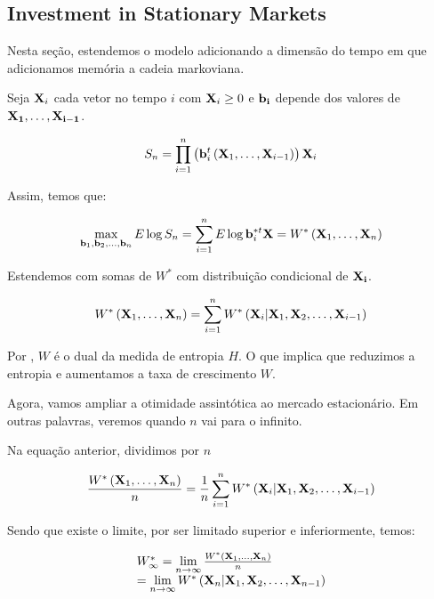 \subsection{Investment in Stationary Markets}

Nesta seção, estendemos o modelo adicionando a dimensão do tempo em que adicionamos memória a cadeia markoviana.

Seja ${{\bf{X}}_i}$ cada vetor no tempo $i$ com ${{\bf{X}}_i} \ge 0$ e $\bf{b}_i$ depende dos valores de $\bf{X}_1, \dots, \bf{X}_{i-1}$.

\[{S_n} = \prod\limits_{i = 1}^n {\left( {{\bf{b}}_i^t\left( {{{\bf{X}}_1}, \ldots ,{{\bf{X}}_{i - 1}}} \right)} \right){{\bf{X}}_i}} \]

Assim, temos que:

\[\mathop {\max }\limits_{{{\bf{b}}_1},{{\bf{b}}_2}, \ldots ,{{\bf{b}}_n}} E\log {S_n} = \sum\limits_{i = 1}^n {E\log {\bf{b}}_i^{*t}{\bf{X}}}  = {W^*}\left( {{{\bf{X}}_1}, \ldots ,{{\bf{X}}_n}} \right)\]

Estendemos com somas de $W^*$ com distribuição condicional de $\bf{X}_i$.

\[{W^*}\left( {{{\bf{X}}_1}, \ldots ,{{\bf{X}}_n}} \right) = \sum\limits_{i = 1}^n {{W^*}\left( {{{\bf{X}}_i}|{{\bf{X}}_1},{{\bf{X}}_2}, \ldots ,{{\bf{X}}_{i - 1}}} \right)} \]

Por \cite{Cover:2006:EIT:1146355}, $W$ é o dual da medida de entropia $H$. O que implica que reduzimos a entropia e aumentamos a taxa de crescimento $W$.

Agora, vamos ampliar a otimidade assintótica ao mercado estacionário. Em outras palavras, veremos quando $ n $ vai para o infinito.

Na equação anterior, dividimos por $n$

\[\frac{{{W^*}\left( {{{\bf{X}}_1}, \ldots ,{{\bf{X}}_n}} \right)}}{n} = \frac{1}{n}\sum\limits_{i = 1}^n {{W^*}\left( {{{\bf{X}}_i}|{{\bf{X}}_1},{{\bf{X}}_2}, \ldots ,{{\bf{X}}_{i - 1}}} \right)} \]

Sendo que existe o limite, por ser limitado superior e inferiormente, temos:

\[\begin{array}{l}
W_\infty ^* = \mathop {\lim }\limits_{n \to \infty } \frac{{{W^*}\left( {{{\bf{X}}_1}, \ldots ,{{\bf{X}}_n}} \right)}}{n}\\
 = \mathop {\lim }\limits_{n \to \infty } {W^*}\left( {{{\bf{X}}_n}|{{\bf{X}}_1},{{\bf{X}}_2}, \ldots ,{{\bf{X}}_{n - 1}}} \right)
\end{array}\]

